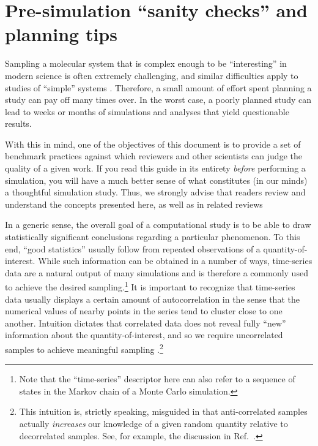 \section{Pre-simulation ``sanity checks'' and planning tips}
\label{sec:sanity}

Sampling a molecular system that is complex enough to be ``interesting'' in modern science is often extremely challenging, and similar difficulties apply to studies of ``simple'' systems \cite{Schappals2017}.
Therefore, a small amount of effort spent planning a study can pay off many times over.  In the worst case, a poorly planned study can lead to weeks or months of simulations and analyses that yield questionable results.

With this in mind, one of the objectives of this document is to provide a set of benchmark practices against which reviewers and other scientists can judge the quality of a given work.  If you read this guide in its entirety \emph{before} performing a simulation, you will have a much better sense of what constitutes (in our minds) a thoughtful simulation study.  Thus, we strongly advise that readers review and understand the concepts presented here, as well as in related reviews \cite{Grossfield2009,JCGM:GUM2008,PatroneUQreview}

In a generic sense, the overall goal of a computational study is to be able to draw statistically significant conclusions regarding a particular phenomenon.  To this end, ``good statistics'' usually follow from repeated observations of a quantity-of-interest.  While such information can be obtained in a number of ways, time-series data are a natural output of many simulations and is therefore a commonly used to achieve the desired sampling.\footnote{Note that the ``time-series'' descriptor here can also refer to a sequence of states in the Markov chain of a Monte Carlo simulation.}  
It is important to recognize that time-series data usually displays a certain amount of autocorrelation in the sense that the numerical values of nearby points in the series tend to cluster close to one another.  Intuition dictates that correlated data does not reveal fully ``new'' information about the quantity-of-interest, and so we require uncorrelated samples to achieve meaningful sampling \cite{PatroneAIAA}.\footnote{This intuition is, strictly speaking, misguided in that anti-correlated samples actually {\it increases} our knowledge of a given random quantity relative to decorrelated samples.  See, for example, the discussion in Ref.~\cite{PatroneAIAA}.}

